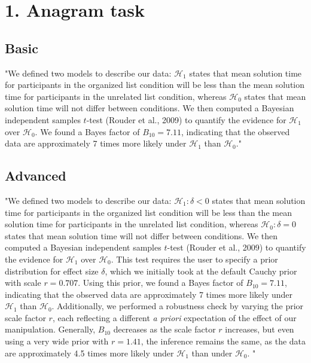 \documentclass[11pt]{article}
\date{}
\title{}
\begin{document}
\section*{1. Anagram task}
\label{sec:orga6576f0}
\subsection*{Basic}
\label{sec:orgd26c79f}
"We defined two models to describe our data: \(\mathcal{H}_1\) states that mean solution time for participants in the organized list condition will be less than the mean solution time for participants in the unrelated list condition, whereas \(\mathcal{H}_0\) states that mean solution time will not differ between conditions. We then computed a Bayesian independent samples \(t\)-test (Rouder et al., 2009) to quantify the evidence for \(\mathcal{H}_1\) over \(\mathcal{H}_0\).  We found a Bayes factor of \(B_{10}=7.11\), indicating that the observed data are approximately 7 times more likely under \(\mathcal{H}_1\) than \(\mathcal{H}_0\)."

\subsection*{Advanced}
\label{sec:org31ad35a}
"We defined two models to describe our data: \(\mathcal{H}_1:\delta < 0\) states that mean solution time for participants in the organized list condition will be less than the mean solution time for participants in the unrelated list condition, whereas \(\mathcal{H}_0:\delta=0\) states that mean solution time will not differ between conditions. We then computed a Bayesian independent samples \(t\)-test (Rouder et al., 2009) to quantify the evidence for \(\mathcal{H}_1\) over \(\mathcal{H}_0\). This test requires the user to specify a prior distribution for effect size \(\delta\), which we initially took at the default Cauchy prior with scale \(r=0.707\). Using this prior, we found a Bayes factor of \(B_{10}=7.11\), indicating that the observed data are approximately 7 times more likely under \(\mathcal{H}_1\) than \(\mathcal{H}_0\).  Additionally, we performed a robustness check by varying the prior scale factor \(r\), each reflecting a different \emph{a priori} expectation of the effect of our manipulation. Generally, \(B_{10}\) decreases as the scale factor \(r\) increases, but even using a very wide prior with \(r=1.41\), the inference remains the same, as the data are approximately 4.5 times more likely under \(\mathcal{H}_1\) than under \(\mathcal{H}_0\). "
\end{document}
